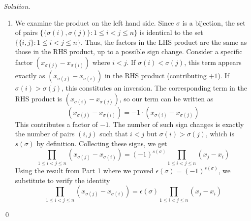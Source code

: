\documentclass[12pt,a4paper]{article}
\newenvironment{solution}{%
  \par\noindent\textit{Solution.}\ }{\qed}
\theoremstyle{problemstyle}
\begin{document}
\begin{solution}
\begin{enumerate}[label=\arabic*.]
    Now, we calculate $f(\sigma=(a,b))$ for some $a<_{\text{WLOG}}b$. 
    For the pair $(i,j)$ (with $i<j$) to potentially be such that $\sigma(i)>\sigma(j)$ we must have that $\{i,j\}\cap\{a,b\}\neq\emptyset$ as $\sigma$ is identity outside $\{a,b\}$. 
    We look at these pairs now: pairs of form $(i,a)$ do not result in inversions as $\sigma(i)=i<a<=\sigma(a)$, pairs of form $(i,b)$ only result in inversions for $a\leq i<b$ and there are $b-a$ such $i$ so these result in $(b-a)$ inversions, the pairs of form $(a,i)$ only result in inversions for $a<i\leq b$ resulting in $b-a+1$ inversions again and the pairs of form $(b,i)$ do not result in any inversions. 
    Thus the total number of inversions is $2(b-a)+1$ and thus $f((a,b)=(-1)^{2(b-a)+1})=-1$ and this is all we need to prove that $f\equiv\epsilon.$ 
    We have shown that $\epsilon$ and $f$ agree on transpositons($\epsilon((a,b))$ is also $-1$ for $a\neq b$ as shown in class.) and as both of these are multiplicative we see that for any $\sigma$, by first writing it as a product of transpositons $\sigma=\tau_1\cdots\tau_n$ and then using the multiplicativity as follows
    $$f(\sigma)=f(\tau_1\cdots\tau_n)=f(\tau_1)\cdots f(\tau_n)=(-1)^n=\epsilon(\tau_1)\cdots\epsilon(\tau_n)=\epsilon(\tau_1\cdots\tau_n)=\epsilon(\sigma)$$
    \item
    We examine the product on the left hand side. Since $\sigma$ is a bijection, the set of pairs $\{\{\sigma(i), \sigma(j)\} : 1 \le i < j \le n\}$ is identical to the set $\{\{i, j\} : 1 \le i < j \le n\}$. Thus, the factors in the LHS product are the same as those in the RHS product, up to a possible sign change. 
    Consider a specific factor $(x_{\sigma(j)} - x_{\sigma(i)})$ where $i < j$. 
    If $\sigma(i) < \sigma(j)$, this term appears exactly as $(x_{\sigma(j)} - x_{\sigma(i)})$ in the RHS product (contributing $+1$). 
    If $\sigma(i) > \sigma(j)$, this constitutes an inversion. The corresponding term in the RHS product is $(x_{\sigma(i)} - x_{\sigma(j)})$, so our term can be written as
    $$(x_{\sigma(j)} - x_{\sigma(i)}) = -1 \cdot (x_{\sigma(i)} - x_{\sigma(j)})$$ 
    This contributes a factor of $-1$. The number of such sign changes is exactly the number of pairs $(i, j)$ such that $i < j$ but $\sigma(i) > \sigma(j)$, which is $s(\sigma)$ by definition. 
    Collecting these signs, we get
    $$ \prod_{1 \le i < j \le n} (x_{\sigma(j)} - x_{\sigma(i)}) = (-1)^{s(\sigma)} \prod_{1 \le i < j \le n} (x_j - x_i) $$
    Using the result from Part 1 where we proved $\epsilon(\sigma) = (-1)^{s(\sigma)}$, we substitute to verify the identity 
    $$\prod_{1 \le i < j \le n} (x_{\sigma(j)} - x_{\sigma(i)}) = \epsilon(\sigma) \prod_{1 \le i < j \le n} (x_j - x_i)$$ 
    \end{enumerate}
\end{solution}
\end{document}
